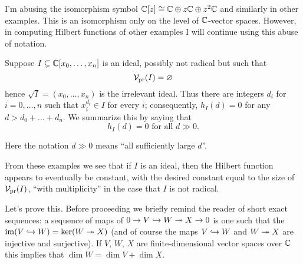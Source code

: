 \begin{abuse}
	I'm abusing the isomorphism symbol
	$\mathbb C[z] \cong \mathbb C \oplus z\mathbb C \oplus z^2\mathbb C$ and similarly
	in other examples.
	This is an isomorphism only on the level of $\mathbb C$-vector spaces.
	However, in computing Hilbert functions of other examples
	I will continue using this abuse of notation.
\end{abuse}
\begin{example}
	Suppose $I \subsetneq \mathbb C[x_0, \dots, x_n]$
	is an ideal, possibly not radical
	but such that \[ \mathcal V_{\text{pr}}(I) = \varnothing \]
	hence $\sqrt I = (x_0, \dots, x_n)$ is the irrelevant ideal.
	Thus there are integers $d_i$ for $i=0,\dots,n$ such that
	$x_i^{d_i} \in I$ for every $i$; consequently, $h_I(d) = 0$
	for any $d > d_0 + \dots + d_n$.
	We summarize this by saying that
	\[ h_I(d) = 0 \text{ for all $d \gg 0$}. \]
\end{example}
Here the notation $d\gg 0$ means ``all sufficiently large $d$''.

From these examples we see that if $I$ is an ideal,
then the Hilbert function appears to eventually be constant,
with the desired constant equal to the size of $\mathcal V_{\text{pr}}(I)$,
``with multiplicity'' in the case that $I$ is not radical.

Let's prove this.
Before proceeding we briefly remind the reader of short exact sequences:
a sequence of maps of $0 \to V \hookrightarrow W \twoheadrightarrow X \to 0$
is one such that the $\operatorname{im}(V \hookrightarrow W) = \ker(W \twoheadrightarrow X)$
(and of course the maps $V \hookrightarrow W$ and $W \twoheadrightarrow X$ are
injective and surjective).
If $V$, $W$, $X$ are finite-dimensional vector spaces over $\mathbb C$
this implies that $\dim W = \dim V + \dim X$.

